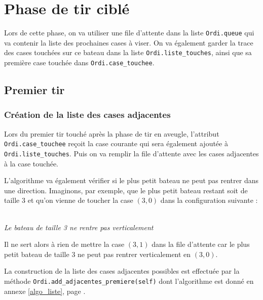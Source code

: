 \section{Phase de tir ciblé}
Lors de cette phase, on va utiliser une file d'attente dans la liste \texttt{Ordi.queue} qui va contenir la liste des prochaines cases à viser. On va également garder la trace des cases touchées sur ce bateau dans la liste \texttt{Ordi.liste\_touches}, ainsi que sa première case touchée dans \texttt{Ordi.case\_touchee}.
\subsection{Premier tir}
\subsubsection{Création de la liste des cases adjacentes}
Lors du premier tir touché après la phase de tir en aveugle, l'attribut \texttt{Ordi.case\_touchee} reçoit la case courante qui sera également ajoutée à \texttt{Ordi.liste\_touches}. Puis on va remplir la file d'attente avec les cases adjacentes à la case touchée.

L'algorithme va également vérifier si le plus petit bateau ne peut pas rentrer dans une direction. Imaginons, par exemple, que le plus petit bateau restant soit de taille 3 et qu'on vienne de toucher la case $(3,0)$ dans la configuration suivante :

\begin{center}
\\
\textit{Le bateau de taille 3 ne rentre pas verticalement}
\end{center}
Il ne sert alors à rien de mettre la case $(3,1)$ dans la file d'attente car le plus petit bateau de taille 3 ne peut pas rentrer verticalement en $(3,0)$.

La construction de la liste des cases adjacentes possibles est effectuée par la méthode \texttt{Ordi.add\_adjacentes\_premiere(self)} dont l'algorithme est donné en annexe \ref{algo_liste}, page \pageref{add_adjacentes_premiere}.

